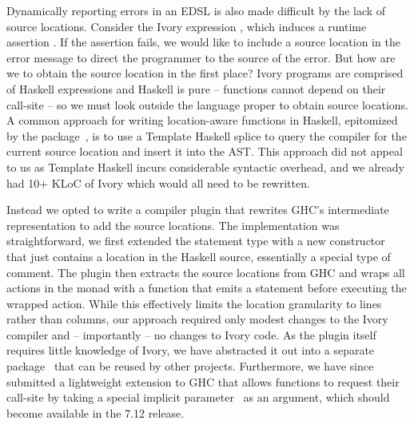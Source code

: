 Dynamically reporting errors in an EDSL is also made difficult by the lack of
source locations. Consider the Ivory expression \hbox{,} which induces a
runtime assertion . If the assertion fails, we would like to include
a source location in the error message to direct the programmer to the source of
the error. But how are we to obtain the source location in the first place?
Ivory programs are comprised of Haskell expressions and Haskell is pure --
functions cannot depend on their call-site -- so we must look outside the
language proper to obtain source locations. A common approach for writing
location-aware functions in Haskell, epitomized by the 
package~\cite{file-location}, is to use a Template Haskell splice to query the
compiler for the current source location and insert it into the AST. This
approach did not appeal to us as Template Haskell incurs considerable syntactic
overhead, and we already had 10+ KLoC of Ivory which would all need to be
rewritten.

Instead we opted to write a compiler plugin that rewrites GHC's intermediate
representation to add the source locations. The implementation was
straightforward, we first extended the  statement type with a new
 constructor that just contains a location in the Haskell source,
essentially a special type of comment. The plugin then extracts the source
locations from GHC and wraps all actions in the  monad with a
 function that emits a  statement before executing
the wrapped action. While this effectively limits the location granularity to
lines rather than columns, our approach required only modest changes to the
Ivory compiler and -- importantly -- no changes to Ivory code. As the plugin
itself requires little knowledge of Ivory, we have abstracted it out into a
separate package~\cite{ghc-srcspan-plugin} that can be reused by other projects.
Furthermore, we have since submitted a lightweight extension to GHC that allows
functions to request their call-site by taking a special implicit
parameter~\cite{lewis2000implicit} as an argument, which should become available
in the 7.12 release.


